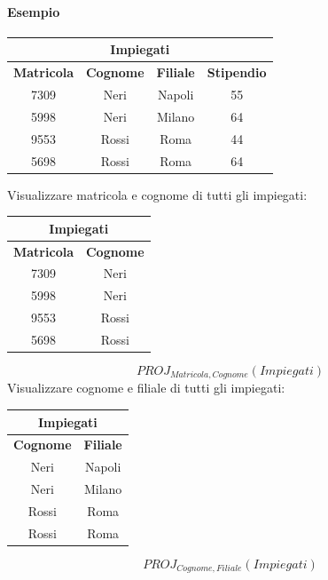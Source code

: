 \documentclass[../main.tex]{subfiles}
\begin{document}
	\paragraph{Esempio}
	\begin{center}
		\begin{tabular}{ |c|c|c|c| }
			\hline
			\multicolumn{4}{|c|}{Impiegati}\\
			\hline
			\textbf{Matricola} & \textbf{Cognome} & \textbf{Filiale} & \textbf{Stipendio}\\
			\hline
			7309 & Neri & Napoli & 55\\
			5998 & Neri & Milano & 64\\
			9553 & Rossi & Roma & 44\\
			5698 & Rossi & Roma & 64\\
			\hline
		\end{tabular}
	\end{center}
	Visualizzare matricola e cognome di tutti gli impiegati:
	\begin{center}
		\begin{tabular}{ |c|c| }
			\hline
			\multicolumn{2}{|c|}{Impiegati}\\
			\hline
			\textbf{Matricola} & \textbf{Cognome} \\
			\hline
			7309 & Neri \\
			5998 & Neri \\
			9553 & Rossi \\
			5698 & Rossi \\
			\hline
		\end{tabular}
	\end{center}
	\[PROJ_{Matricola,Cognome}(Impiegati)\]
	Visualizzare cognome e filiale di tutti gli impiegati:
	\begin{center}
		\begin{tabular}{ |c|c| }
			\hline
			\multicolumn{2}{|c|}{Impiegati}\\
			\hline
			\textbf{Cognome} & \textbf{Filiale} \\
			\hline
			Neri & Napoli \\
			Neri & Milano \\
			Rossi & Roma \\
			Rossi & Roma \\
			\hline
		\end{tabular}
	\end{center}
	\[PROJ_{Cognome,Filiale} (Impiegati)\]
\end{document}
